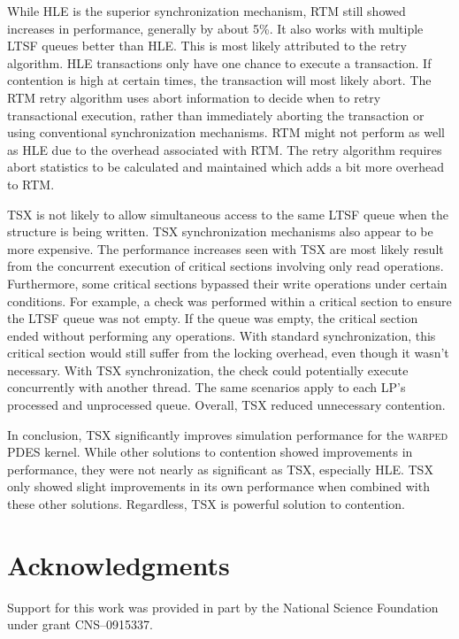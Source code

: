 \documentclass{sig-alternate}
\begin{document}
While HLE is the superior synchronization mechanism, RTM still showed increases in
performance, generally by about 5\%.  It also works with multiple LTSF queues better than
HLE.  This is most likely attributed to the retry algorithm.  HLE transactions only have
one chance to execute a transaction. If contention is high at certain times, the
transaction will most likely abort.  The RTM retry algorithm uses abort information to
decide when to retry transactional execution, rather than immediately aborting the
transaction or using conventional synchronization mechanisms.  RTM might not perform as
well as HLE due to the overhead associated with RTM.  The retry algorithm requires abort
statistics to be calculated and maintained which adds a bit more overhead to RTM.

TSX is not likely to allow simultaneous access to the same LTSF queue when the structure
is being written.  TSX synchronization mechanisms also appear to be more expensive.  The
performance increases seen with TSX are most likely result from the concurrent execution
of critical sections involving only read operations.  Furthermore, some critical sections
bypassed their write operations under certain conditions.  For example, a check was
performed within a critical section to ensure the LTSF queue was not empty.  If the queue
was empty, the critical section ended without performing any operations.  With standard
synchronization, this critical section would still suffer from the locking overhead, even
though it wasn't necessary.  With TSX synchronization, the check could potentially execute
concurrently with another thread.  The same scenarios apply to each LP's processed and
unprocessed queue.  Overall, TSX reduced unnecessary contention.


In conclusion, TSX significantly improves simulation performance for the \textsc{warped}
PDES kernel.  While other solutions to contention showed improvements in performance, they
were not nearly as significant as TSX, especially HLE.  TSX only showed slight
improvements in its own performance when combined with these other solutions.  Regardless,
TSX is powerful solution to contention.

\section*{Acknowledgments}

Support for this work was provided in part by the National Science Foundation under grant
CNS--0915337.



\end{document}
